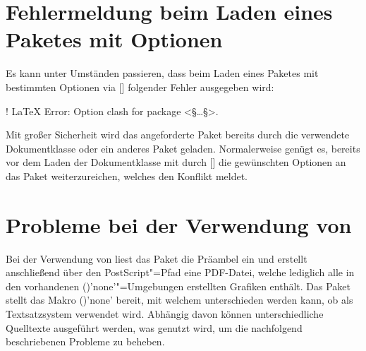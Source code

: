 \section{Fehlermeldung beim Laden eines Paketes mit Optionen}
%
Es kann unter Umständen passieren, dass beim Laden eines Paketes mit bestimmten 
Optionen via [] 
folgender Fehler ausgegeben wird:
%
\begin{quoting}
\begin{Code}[escapechar=§]
! LaTeX Error: Option clash for package <§\dots§>.
\end{Code}
\end{quoting}
%
Mit großer Sicherheit wird das angeforderte Paket bereits durch die verwendete 
Dokumentklasse oder ein anderes Paket geladen. Normalerweise genügt es, bereits 
vor dem Laden der Dokumentklasse mit  durch 
[] die 
gewünschten Optionen an das Paket weiterzureichen, welches den Konflikt meldet.



\section{Probleme bei der Verwendung von }
%
Bei der Verwendung von  liest das Paket  
die Präambel ein und erstellt anschließend über den PostScript"=Pfad 
 eine PDF-Datei, 
welche lediglich alle in den vorhandenen 
()'none'"=Umgebungen erstellten 
Grafiken enthält. Das Paket  stellt das Makro 
()'none' bereit, mit welchem unterschieden werden 
kann, ob  als Textsatzsystem verwendet wird. Abhängig davon 
können unterschiedliche Quelltexte ausgeführt werden, was genutzt wird, um die 
nachfolgend beschriebenen Probleme zu beheben.
%
\begin{quoting}
\begin{Code}
\usepackage{ifpdf}
\end{Code}
\end{quoting}

